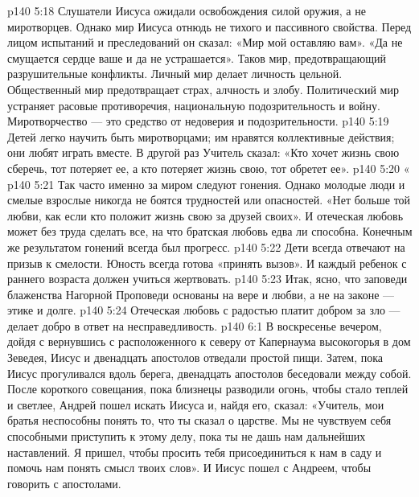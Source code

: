 \vs p140 5:18 \pc {}\bibnobreakspace {} Слушатели Иисуса ожидали освобождения силой оружия, а не миротворцев. Однако мир Иисуса отнюдь не тихого и пассивного свойства. Перед лицом испытаний и преследований он сказал: «Мир мой оставляю вам». «Да не смущается сердце ваше и да не устрашается». Таков мир, предотвращающий разрушительные конфликты. Личный мир делает личность цельной. Общественный мир предотвращает страх, алчность и злобу. Политический мир устраняет расовые противоречия, национальную подозрительность и войну. Миротворчество --- это средство от недоверия и подозрительности.
\vs p140 5:19 Детей легко научить быть миротворцами; им нравятся коллективные действия; они любят играть вместе. В другой раз Учитель сказал: «Кто хочет жизнь свою сберечь, тот потеряет ее, а кто потеряет жизнь свою, тот обретет ее».
\vs p140 5:20 \pc {}\bibnobreakspace «
\vs p140 5:21 Так часто именно за миром следуют гонения. Однако молодые люди и смелые взрослые никогда не боятся трудностей или опасностей. «Нет больше той любви, как если кто положит жизнь свою за друзей своих». И отеческая любовь может без труда сделать все, на что братская любовь едва ли способна. Конечным же результатом гонений всегда был прогресс.
\vs p140 5:22 Дети всегда отвечают на призыв к смелости. Юность всегда готова «принять вызов». И каждый ребенок с раннего возраста должен учиться жертвовать.
\vs p140 5:23 \pc Итак, ясно, что заповеди блаженства Нагорной Проповеди основаны на вере и любви, а не на законе --- этике и долге.
\vs p140 5:24 \pc Отеческая любовь с радостью платит добром за зло --- делает добро в ответ на несправедливость.
\vs p140 6:1 В воскресенье вечером, дойдя с вернувшись с расположенного к северу от Капернаума высокогорья в дом Зеведея, Иисус и двенадцать апостолов отведали простой пищи. Затем, пока Иисус прогуливался вдоль берега, двенадцать апостолов беседовали между собой. После короткого совещания, пока близнецы разводили огонь, чтобы стало теплей и светлее, Андрей пошел искать Иисуса и, найдя его, сказал: «Учитель, мои братья неспособны понять то, что ты сказал о царстве. Мы не чувствуем себя способными приступить к этому делу, пока ты не дашь нам дальнейших наставлений. Я пришел, чтобы просить тебя присоединиться к нам в саду и помочь нам понять смысл твоих слов». И Иисус пошел с Андреем, чтобы говорить с апостолами.
